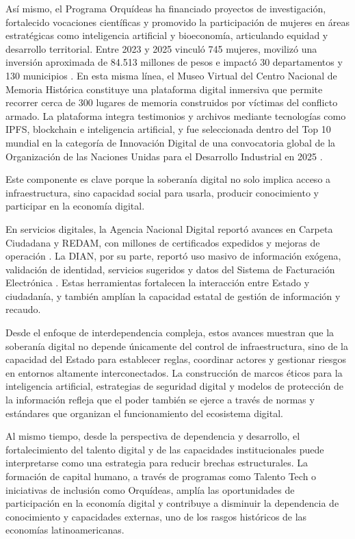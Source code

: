 \documentclass[9pt,letterpaper,twocolumn,twoside,apabib]{rho-class/rho}
\begin{document}
Así mismo, el Programa Orquídeas ha financiado proyectos de investigación, fortalecido vocaciones científicas y promovido la participación de mujeres en áreas estratégicas como inteligencia artificial y bioeconomía, articulando equidad y desarrollo territorial. Entre 2023 y 2025 vinculó 745 mujeres, movilizó una inversión aproximada de 84.513 millones de pesos e impactó 30 departamentos y 130 municipios \parencite{minciencias_orquideas_2025}. En esta misma línea, el Museo Virtual del Centro Nacional de Memoria Histórica constituye una plataforma digital inmersiva que permite recorrer cerca de 300 lugares de memoria construidos por víctimas del conflicto armado. La plataforma integra testimonios y archivos mediante tecnologías como IPFS, blockchain e inteligencia artificial, y fue seleccionada dentro del Top 10 mundial en la categoría de Innovación Digital de una convocatoria global de la Organización de las Naciones Unidas para el Desarrollo Industrial en 2025 \parencite{unido_innovacion_digital_2025}.

Este componente es clave porque la soberanía digital no solo implica acceso a infraestructura, sino capacidad social para usarla, producir conocimiento y participar en la economía digital.

En servicios digitales, la Agencia Nacional Digital reportó avances en Carpeta Ciudadana y REDAM, con millones de certificados expedidos y mejoras de operación \parencite{and_informe_gestion_2024}. La DIAN, por su parte, reportó uso masivo de información exógena, validación de identidad, servicios sugeridos y datos del Sistema de Facturación Electrónica \parencite{dian_informe_gestion_2025,dian_cifras_sfe_2026}. Estas herramientas fortalecen la interacción entre Estado y ciudadanía, y también amplían la capacidad estatal de gestión de información y recaudo.

Desde el enfoque de interdependencia compleja, estos avances muestran que la soberanía digital no depende únicamente del control de infraestructura, sino de la capacidad del Estado para establecer reglas, coordinar actores y gestionar riesgos en entornos altamente interconectados. La construcción de marcos éticos para la inteligencia artificial, estrategias de seguridad digital y modelos de protección de la información refleja que el poder también se ejerce a través de normas y estándares que organizan el funcionamiento del ecosistema digital.

Al mismo tiempo, desde la perspectiva de dependencia y desarrollo, el fortalecimiento del talento digital y de las capacidades institucionales puede interpretarse como una estrategia para reducir brechas estructurales. La formación de capital humano, a través de programas como Talento Tech o iniciativas de inclusión como Orquídeas, amplía las oportunidades de participación en la economía digital y contribuye a disminuir la dependencia de conocimiento y capacidades externas, uno de los rasgos históricos de las economías latinoamericanas.
\end{document}
